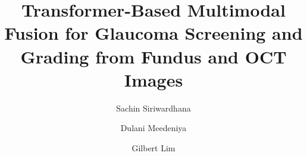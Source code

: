 \documentclass[preprint,12pt]{elsarticle}
\begin{document}
\begin{frontmatter}



    \title{Transformer-Based Multimodal Fusion for Glaucoma Screening and Grading from Fundus and OCT Images}


    \author[auth1]{Sachin Siriwardhana} %
    \author[auth1]{Dulani Meedeniya} %
    \author[auth2]{Gilbert Lim} %
    \address[auth1]{Department of Computer Science \& Engineering, University of Moratuwa, Moratuwa 10400, Sri Lanka}
    \address[auth2]{SingHealth AI Health Program, SingHealth Group, Singapore 168582}



\end{frontmatter}
\end{document}
